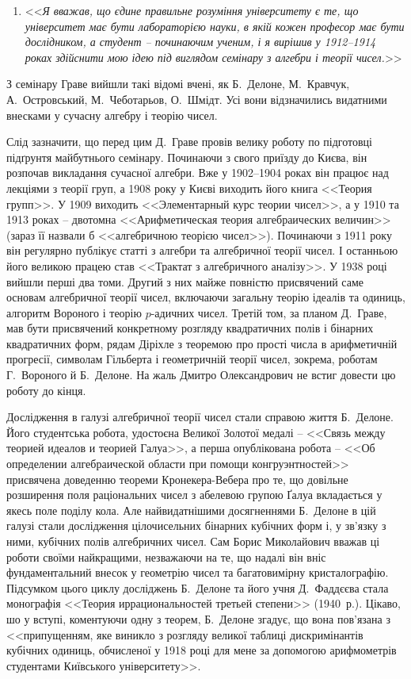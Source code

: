 \begin{enumerate}[nosep, label={}, wide=0pt]
\item 
<<\emph{Я вважав, що єдине правильне розуміння університету є те, що університет має бути лабораторією науки, в якій кожен професор має бути дослідником, а студент -- починаючим ученим, і я вирішив у 1912--1914 роках здійснити мою ідею під виглядом семінару з алгебри і теорії чисел.}>>
\end{enumerate}

З семінару Граве вийшли такі відомі вчені, як Б.~Делоне, М.~Кравчук, А.~Островський, М.~Чеботарьов, О.~Шмідт. 
Усі вони відзначились видатними внесками у сучасну алгебру і теорію чисел.

Слід зазначити, що перед цим Д.~Граве провів велику роботу по підготовці підґрунтя майбутнього семінару. 
Починаючи з свого приїзду до Києва, він розпочав викладання сучасної алгебри. 
Вже у 1902--1904 роках він працює над лекціями з теорії груп, а 1908 року у Києві виходить його книга <<Теория групп>>. 
У 1909 виходить <<Элементарный курс теории чисел>>, а у 1910 та 1913 роках -- двотомна <<Арифметическая теория алгебраических величин>> (зараз її назвали б <<алгебричною теорією чисел>>). 
Починаючи з 1911 року він регулярно публікує статті з алгебри та алгебричної теорії чисел. 
І останньою його великою працею став <<Трактат з алгебричного аналізу>>. 
У 1938 році вийшли перші два томи. Другий з них майже повністю присвячений саме основам алгебричної теорії чисел, включаючи загальну теорію ідеалів та одиниць, алгоритм Вороного і теорію $p$-адичних чисел. 
Третій том, за планом Д.~Граве, мав бути присвячений конкретному розгляду квадратичних полів і бінарних квадратичних форм, рядам Діріхле з теоремою про прості числа в арифметичній прогресії, символам Гільберта і геометричній теорії чисел, зокрема, роботам Г.~Вороного й Б.~Делоне. 
На жаль Дмитро Олександрович не встиг довести цю роботу до кінця.

Дослідження в галузі алгебричної теорії чисел стали справою життя Б.~Делоне. 
Його студентська робота, удостоєна Великої Золотої медалі -- <<Связь между теорией идеалов и теорией Галуа>>, а перша опублікована робота -- <<Об определении алгебраической области при помощи конгруэнтностей>> присвячена доведенню теореми Кронекера-Вебера про те, що довільне розширення поля раціональних чисел з абелевою групою Ґалуа вкладається у якесь поле поділу кола. 
Але найвидатнішими досягненнями Б.~Делоне в цій галузі стали дослідження цілочисельних бінарних кубічних форм і, у зв'язку з ними, кубічних полів алгебричних чисел. 
Сам Борис Миколайович вважав ці роботи своїми найкращими, незважаючи на те, що надалі він вніс фундаментальний внесок у геометрію чисел та багатовимірну кристалографію. 
Підсумком цього циклу досліджень Б.~Делоне та його учня Д.~Фаддєєва стала монографія <<Теория иррациональностей третьей степени>> (1940~р.).
Цікаво, шо у вступі, коментуючи одну з теорем, Б.~Делоне згадує, що вона пов'язана з <<припущенням, яке виникло з розгляду великої таблиці дискримінантів кубічних одиниць, обчисленої у 1918 році для мене за допомогою арифмометрів студентами Київського університету>>.


